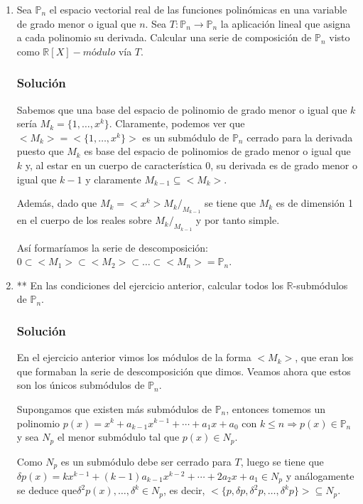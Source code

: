 \documentclass[paper=a4, fontsize=11pt, spanish]{scrartcl}
\begin{document}
\begin{enumerate}
		\item Sea $\mathbb{P}_n$ el espacio vectorial real de las funciones polinómicas en una variable de grado
		menor o igual que $n$. Sea $T: \mathbb{P}_n \rightarrow \mathbb{P}_n$ la aplicación lineal que asigna a
		cada polinomio su derivada. Calcular una serie de composición de $\mathbb{P}_n$ visto como $\mathbb{R}[X]
		-módulo$ vía $T$.
		\subsubsection*{Solución}
		Sabemos que una base del espacio de polinomio de grado menor o igual que $k$ sería $M_k = \{1, \dots, x^k\}$.
		Claramente, podemos ver que $<M_k> = <\{1, \dots, x^k\}>$ es un submódulo de $\mathbb{P}_n$ cerrado para
		la derivada puesto que $M_k$ es base del espacio de polinomios de grado menor o igual que $k$ y, al estar
		en un cuerpo de característica 0, su derivada es de grado menor o igual que $k-1$ y claramente $M_{k-1}
		\subseteq <M_k>$.
		
		Además, dado que $M_k = <x^k> M_k/_{M_{k-1}}$ se tiene que $M_k$ es de dimensión 1 en el cuerpo de los
		reales sobre $M_k/_{M_{k-1}}$ y por tanto simple.
		
		Así formaríamos la serie de descomposición: $0 \subset <M_1> \subset <M_2> \subset \dots \subset <M_n> =
		\mathbb{P}_n$.
		
		\item ** En las condiciones del ejercicio anterior, calcular todos los $\mathbb{R}$-submódulos de
		$\mathbb{P}_n$.
		\subsubsection*{Solución}
		En el ejercicio anterior vimos los módulos de la forma $<M_k>$, que eran los que formaban la serie de
		descomposición que dimos. Veamos ahora que estos son los únicos submódulos de $\mathbb{P}_n$.
		
		Supongamos que existen más submódulos de $\mathbb{P}_n$, entonces tomemos un polinomio $p(x) = x^k +
		a_{k-1}x^{k-1} + \cdots + a_1x+a_0$ con $k \leq n \Rightarrow p(x) \in \mathbb{P}_n$ y sea $N_p$ el menor
		submódulo tal que $p(x) \in N_p$.
		
		Como $N_p$ es un submódulo debe ser cerrado para $T$, luego se tiene
		que $\delta p(x) = kx^{k-1} + (k-1)a_{k-1}x^{k-2} + \cdots + 2a_2x+a_1 \in N_p$ y análogamente se deduce
		que$\delta^2 p(x), \dots, \delta^{k} \in N_p$, es decir, $<\{p, \delta p, \delta^2 p, \dots, \delta^k p\}>
		\subseteq N_p$.
		

\end{enumerate}
\end{document}
